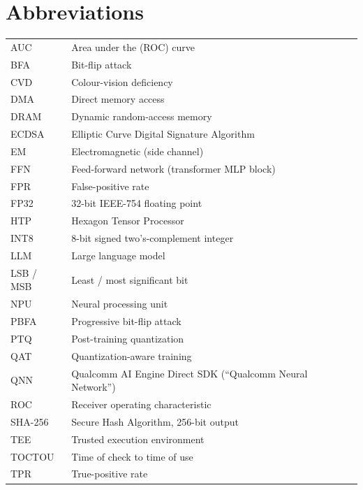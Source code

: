 \chapter*{Abbreviations}
\begin{tabular}{@{}p{2.6cm}p{11cm}@{}}
AUC   & Area under the (ROC) curve \\
BFA   & Bit-flip attack \\
CVD   & Colour-vision deficiency \\
DMA   & Direct memory access \\
DRAM  & Dynamic random-access memory \\
ECDSA & Elliptic Curve Digital Signature Algorithm \\
EM    & Electromagnetic (side channel) \\
FFN   & Feed-forward network (transformer MLP block) \\
FPR   & False-positive rate \\
FP32  & 32-bit IEEE-754 floating point \\
HTP   & Hexagon Tensor Processor \\
INT8  & 8-bit signed two's-complement integer \\
LLM   & Large language model \\
LSB / MSB & Least / most significant bit \\
NPU   & Neural processing unit \\
PBFA  & Progressive bit-flip attack \\
PTQ   & Post-training quantization \\
QAT   & Quantization-aware training \\
QNN   & Qualcomm AI Engine Direct SDK (``Qualcomm Neural Network'') \\
ROC   & Receiver operating characteristic \\
SHA-256 & Secure Hash Algorithm, 256-bit output \\
TEE   & Trusted execution environment \\
TOCTOU & Time of check to time of use \\
TPR   & True-positive rate \\
\end{tabular}

